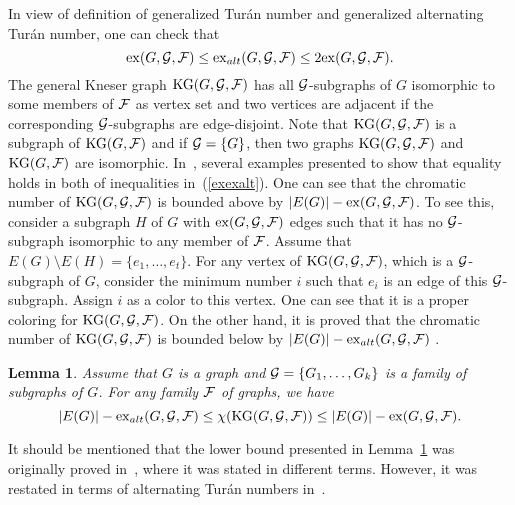 \documentclass[11pt]{article}
\newtheorem{prealphlem}{{\bf Lemma}}
\newenvironment{alphlem}{\begin{prealphlem}{\hspace{-0.5
               em}{\bf.\ }}}{\end{prealphlem}}
\begin{document}
In view of definition of generalized Tur\'an number and generalized alternating Tur\'an number, one can check that 
\begin{equation}\label{exexalt}
{\rm ex}(G, {\cal G},{\cal F})\leq {\rm ex}_{alt}(G, {\cal G}, {\cal F}) \leq 2{\rm ex}(G, {\cal G},{\cal F}).
\end{equation} 
The general Kneser graph ${\rm KG}(G, {\cal G}, {\cal F})$ has all ${\cal G}$-subgraphs of $G$ isomorphic to some members of 
${\cal F}$ as vertex set and two vertices are adjacent if the corresponding ${\cal G}$-subgraphs are edge-disjoint. Note that ${\rm KG}(G, {\cal G}, {\cal F})$ is a subgraph of ${\rm KG}(G, {\cal F})$ and if ${\cal G}=\{G\}$, then two graphs ${\rm KG}(G, {\cal G}, {\cal F})$ and ${\rm KG}(G, {\cal F})$ are isomorphic. 
In~\cite{2014arXiv1401.0138A}, several examples presented to show that equality holds in both of inequalities 
in~(\ref{exexalt}). One can see that the chromatic number of ${\rm KG}(G, {\cal G}, {\cal F})$ is bounded above by 
$|E(G)|-{\rm ex}(G,{\cal G}, {\cal F})$. To see this, consider a subgraph $H$ of $G$ with ${\rm ex}(G,{\cal G}, {\cal F})$ edges such that it has no ${\cal G}$-subgraph isomorphic to any member of ${\cal F}$. Assume that $E(G)\setminus E(H)=\{e_1,\ldots,e_t\}$. 
For any vertex of ${\rm KG}(G, {\cal G}, {\cal F})$, which is a ${\cal G}$-subgraph of $G$, consider the minimum number $i$ such that $e_i$ is 
an edge of this ${\cal G}$-subgraph. Assign $i$ as a color to this vertex. 
One can see that it is a proper coloring for ${\rm KG}(G, {\cal G}, {\cal F})$. 
On the other hand, it is proved that the chromatic number of ${\rm KG}(G, {\cal G}, {\cal F})$ is bounded below by $|E(G)|-{\rm ex}_{alt}(G, {\cal G}, {\cal F})$ \cite{2013arXiv1302.5394A,2014arXiv1401.0138A}. 
\begin{alphlem}\label{ex}{\rm \cite{2013arXiv1302.5394A,2014arXiv1401.0138A}}
Assume that $G$ is a graph and ${\cal G}=\{G_1,\ldots,G_k\}$ is a family of subgraphs of $G$.  
For any family ${\cal F}$ of graphs, we have 
$$\displaystyle
|E(G)|-{\rm ex}_{alt}(G, {\cal G}, {\cal F}) \leq \chi({\rm KG}(G, {\cal G}, {\cal F})) \leq  |E(G)|-{\rm ex}(G, {\cal G}, {\cal F}).$$
\end{alphlem}

It should be mentioned that the lower bound presented in Lemma~\ref{ex} was originally proved in~\cite{2013arXiv1302.5394A}, where it was stated in different terms. However, it was restated in terms of alternating Tur\'an numbers in~\cite{2014arXiv1401.0138A}.
\end{document}
